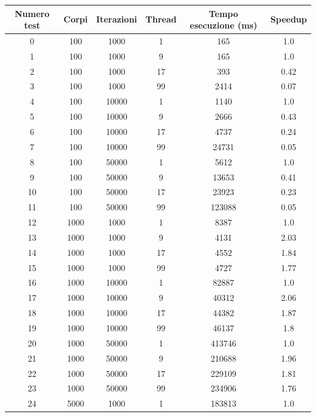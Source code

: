 \documentclass[12pt,a4paper,openright,twoside]{book}
\begin{document}
\begin{center}
	\begin{table}
		\begin{tabular}{ |c|c|c|c|c|c| } 
			\hline
			Numero test & Corpi & Iterazioni & Thread & Tempo esecuzione (ms) & Speedup \\
			\hline
			0 & 100 & 1000 & 1 & 165 & 1.0 \\ 
			\hline
		   1 & 100 & 1000 & 9 & 165 & 1.0 \\ 
			\hline
		   2 & 100 & 1000 & 17 & 393 & 0.42 \\ 
			\hline
		   3 & 100 & 1000 & 99 & 2414 & 0.07 \\ 
			\hline
		   4 & 100 & 10000 & 1 & 1140 & 1.0 \\ 
			\hline
		   5 & 100 & 10000 & 9 & 2666 & 0.43 \\ 
			\hline
		   6 & 100 & 10000 & 17 & 4737 & 0.24 \\ 
			\hline
		   7 & 100 & 10000 & 99 & 24731 & 0.05 \\ 
			\hline
		   8 & 100 & 50000 & 1 & 5612 & 1.0 \\ 
			\hline
		   9 & 100 & 50000 & 9 & 13653 & 0.41 \\ 
			\hline
		   10 & 100 & 50000 & 17 & 23923 & 0.23 \\ 
			\hline
		   11 & 100 & 50000 & 99 & 123088 & 0.05 \\ 
			\hline
		   12 & 1000 & 1000 & 1 & 8387 & 1.0 \\ 
			\hline
		   13 & 1000 & 1000 & 9 & 4131 & 2.03 \\ 
			\hline
		   14 & 1000 & 1000 & 17 & 4552 & 1.84 \\ 
			\hline
		   15 & 1000 & 1000 & 99 & 4727 & 1.77 \\ 
			\hline
		   16 & 1000 & 10000 & 1 & 82887 & 1.0 \\ 
			\hline
		   17 & 1000 & 10000 & 9 & 40312 & 2.06 \\ 
			\hline
		   18 & 1000 & 10000 & 17 & 44382 & 1.87 \\ 
			\hline
		   19 & 1000 & 10000 & 99 & 46137 & 1.8 \\ 
			\hline
		   20 & 1000 & 50000 & 1 & 413746 & 1.0 \\ 
			\hline
		   21 & 1000 & 50000 & 9 & 210688 & 1.96 \\ 
			\hline
		   22 & 1000 & 50000 & 17 & 229109 & 1.81 \\ 
			\hline
		   23 & 1000 & 50000 & 99 & 234906 & 1.76 \\ 
			\hline
		   24 & 5000 & 1000 & 1 & 183813 & 1.0 \\ 

\end{tabular}
\end{table}
\end{center}
\end{document}
